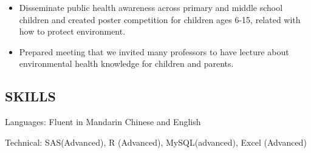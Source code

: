\documentclass[
  a4paper,
]{article}
\providecommand{\tightlist}{%
  \setlength{\itemsep}{0pt}\setlength{\parskip}{0pt}}
\begin{document}
\begin{itemize}
\tightlist
\item Disseminate public health awareness across primary and middle school children and created poster competition for children ages 6-15, related with how to protect environment.
\item Prepared meeting that we invited many professors to have lecture about environmental health knowledge for children and parents.
\end{itemize}
\bigskip
\subsection{SKILLS}
Languages: Fluent in Mandarin Chinese and English

Technical: SAS(Advanced), R (Advanced), MySQL(advanced), Excel (Advanced)
\end{document}
